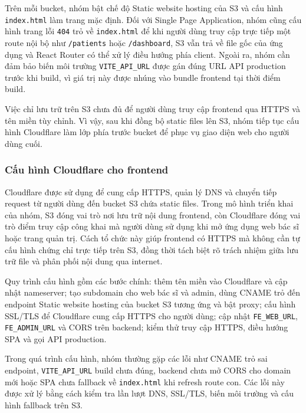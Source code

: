 \par Trên mỗi bucket, nhóm bật chế độ Static website hosting của S3 và cấu hình \texttt{index.html} làm trang mặc định. Đối với Single Page Application, nhóm cũng cấu hình trang lỗi \texttt{404} trỏ về \texttt{index.html} để khi người dùng truy cập trực tiếp một route nội bộ như \texttt{/patients} hoặc \texttt{/dashboard}, S3 vẫn trả về file gốc của ứng dụng và React Router có thể xử lý điều hướng phía client. Ngoài ra, nhóm cần đảm bảo biến môi trường \texttt{VITE\_API\_URL} được gán đúng URL API production trước khi build, vì giá trị này được nhúng vào bundle frontend tại thời điểm build.

\par Việc chỉ lưu trữ trên S3 chưa đủ để người dùng truy cập frontend qua HTTPS và tên miền tùy chỉnh. Vì vậy, sau khi đồng bộ static files lên S3, nhóm tiếp tục cấu hình Cloudflare làm lớp phía trước bucket để phục vụ giao diện web cho người dùng cuối.

\subsubsection{Cấu hình Cloudflare cho frontend}
\par Cloudflare được sử dụng để cung cấp HTTPS, quản lý DNS và chuyển tiếp request từ người dùng đến bucket S3 chứa static files. Trong mô hình triển khai của nhóm, S3 đóng vai trò nơi lưu trữ nội dung frontend, còn Cloudflare đóng vai trò điểm truy cập công khai mà người dùng sử dụng khi mở ứng dụng web bác sĩ hoặc trang quản trị. Cách tổ chức này giúp frontend có HTTPS mà không cần tự cấu hình chứng chỉ trực tiếp trên S3, đồng thời tách biệt rõ trách nhiệm giữa lưu trữ file và phân phối nội dung qua internet.

\par Quy trình cấu hình gồm các bước chính: thêm tên miền vào Cloudflare và cập nhật nameserver; tạo subdomain cho web bác sĩ và admin, dùng CNAME trỏ đến endpoint Static website hosting của bucket S3 tương ứng và bật proxy; cấu hình SSL/TLS để Cloudflare cung cấp HTTPS cho người dùng; cập nhật \texttt{FE\_WEB\_URL}, \texttt{FE\_ADMIN\_URL} và CORS trên backend; kiểm thử truy cập HTTPS, điều hướng SPA và gọi API production.

\par Trong quá trình cấu hình, nhóm thường gặp các lỗi như CNAME trỏ sai endpoint, \texttt{VITE\_API\_URL} build chưa đúng, backend chưa mở CORS cho domain mới hoặc SPA chưa fallback về \texttt{index.html} khi refresh route con. Các lỗi này được xử lý bằng cách kiểm tra lần lượt DNS, SSL/TLS, biến môi trường và cấu hình fallback trên S3.

